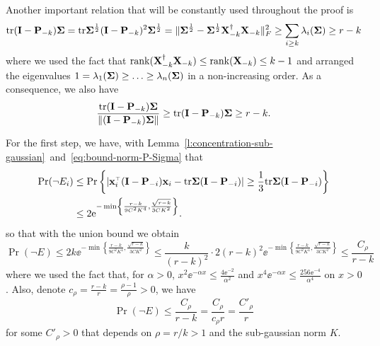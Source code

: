 \documentclass[thesis.tex]{subfiles}
\begin{document}

Another important relation that will be constantly used throughout the proof is
\begin{equation}\label{eq:bound-trace-P-Sigma}
    \mathrm{tr} (\mathbf I - \mathbf P_{-k}) \mathbf{\Sigma} = \mathrm{tr} \mathbf{\Sigma}^{\frac12} (\mathbf I - \mathbf P_{-k})^2 \mathbf{\Sigma}^{\frac12} =
    \|\mathbf{\Sigma}^{\frac12}-\mathbf{\Sigma}^{\frac12}\mathbf X_{-k}^\dagger\mathbf X_{-k}\|_F^2\geq
\sum_{i\geq k}\lambda_i (\mathbf{\Sigma})\geq r-k
\end{equation}
where we used the fact that $\mathrm{rank}(\mathbf X_{-k}^\dagger \mathbf X_{-k}) \le \mathrm{rank}(\mathbf X_{-k}) \le k-1$ and arranged the eigenvalues $ 1 = \lambda_1(\mathbf{\Sigma}) \ge \ldots \ge \lambda_n(\mathbf{\Sigma})$ in a non-increasing order. As a consequence, we also have
\begin{equation}\label{eq:bound-norm-P-Sigma}
  \frac{\mathrm{tr} (\mathbf I - \mathbf P_{-k}) \mathbf{\Sigma}}{ \|  (\mathbf I - \mathbf P_{-k}) \mathbf{\Sigma} \| } \ge \mathrm{tr} (\mathbf I - \mathbf P_{-k}) \mathbf{\Sigma} \geq r-k.
\end{equation}

\bigskip

For the first step, we have, with Lemma~\ref{l:concentration-sub-gaussian}~and~\eqref{eq:bound-norm-P-Sigma} that
\begin{align*}
  \Pr (\neg E_i) &\le \Pr \left\{ \lvert \x_i^\top (\I - \P_{-i}) \x_i - \tr \Sigmab (\I - \P_{-i})  \rvert
    \geq \frac13 \tr \Sigmab (\I - \P_{-i}) \right\} \\ 
    &\le 2 \ee^{ - \min \left\{ \frac{ r -k }{9 C^2 K^4}, \frac{\sqrt{r -k} }{3 C K^2} \right\} }. %
\end{align*}
so that with the union bound we obtain
\begin{equation}\label{eq:union-bound-neg-E}
  \Pr (\neg E) \le 2k \ee^{ - \min \left\{ \frac{ r -k }{9 C^2 K^4}, \frac{\sqrt{r -k} }{3 C K^2} \right\} } \le \frac{k}{(r-k)^2} \cdot 2 (r-k)^2 \ee^{ - \min \left\{ \frac{ r -k }{9 C^2 K^4}, \frac{\sqrt{r -k} }{3 C K^2} \right\} } \le \frac{C_\rho}{r - k}
\end{equation}
where we used the fact that, for $\alpha >0$, $x^2 \ee^{-\alpha x} \le \frac{4 \ee^{-2}}{\alpha^2}$ and  $x^4 \ee^{-\alpha x} \le \frac{256 \ee^{-4}}{\alpha^4}$ on $x > 0$. Also, denote $c_\rho = \frac{r - k}r = \frac{\rho - 1}{\rho} > 0$, we have
\begin{equation}\label{eq:proba-E}
  \Pr(\neg E) \le \frac{C_\rho}{r - k} = \frac{C_\rho}{c_\rho r} = \frac{C'_\rho}{r} 
\end{equation}
for some $C'_\rho > 0$ that depends on $\rho = r/k > 1$ and the sub-gaussian norm $K$.
\end{document}

